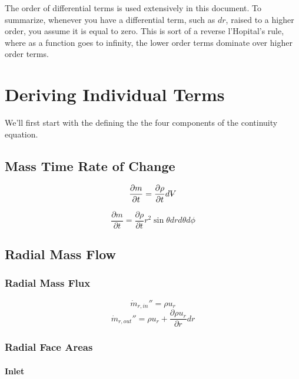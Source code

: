 \documentclass[12pt, letterpaper, twoside]{article}
\makeatletter
\DeclareRobustCommand{\volume}{\text{\volumedash}V}
\newcommand{\volumedash}{%
  \makebox[0pt][l]{%
    \ooalign{\hfil\hphantom{$\m@th V$}\hfil\cr\kern0.08em--\hfil\cr}%
  }%
}
\makeatother
\begin{document}
The order of differential terms is used extensively in this document. To summarize, whenever you have a differential term, such as \(dr\), raised to a higher order, you assume it is equal to zero. This is sort of a reverse l'Hopital's rule, where as a function goes to infinity, the lower order terms dominate over higher order terms.

\section{Deriving Individual Terms} \label{sect:deriveterms}
We'll first start with the defining the the four components of the continuity equation.

    \subsection{Mass Time Rate of Change}
        \begin{equation*}
            \frac{\partial m}{\partial t} = \frac{\partial \rho}{\partial t}d\volume
        \end{equation*}

        \begin{equation}\label{eq:dm/dt}
            \boxed{\frac{\partial m}{\partial t} = 
            \frac{\partial \rho}{\partial t} r^2 \sin\theta dr d\theta d\phi}
        \end{equation}

    \subsection{Radial Mass Flow}
        \subsubsection{Radial Mass Flux}
            \begin{equation}
                \dot{m}_{r,in}'' = \rho u_r
            \end{equation}
            \begin{equation}
                \dot{m}_{r,out}'' = \rho u_r  +
                \frac{\partial \rho u_r}{\partial r} dr
            \end{equation}

        \subsubsection{Radial Face Areas}
        \paragraph{Inlet}
\end{document}
